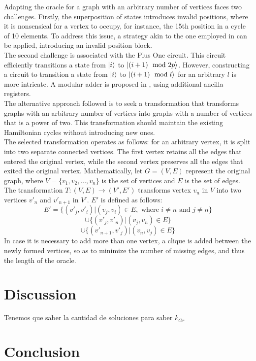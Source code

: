 \documentclass[10pt,a4paper]{article}
\begin{document}
Adapting the oracle for a graph with an arbitrary number of vertices faces two challenges. Firstly, the superposition of states introduces invalid positions, where it is nonsensical for a vertex to occupy, for instance, the 15th position in a cycle of 10 elements. To address this issue, a strategy akin to the one employed in \cite{Coloring1} can be applied, introducing an invalid position block.\\
The second challenge is associated with the Plus One circuit. This circuit efficiently transitions a state from $\ket{i}$ to $\ket{(i + 1) \mod 2p}$. However, constructing a circuit to transition a state from $\ket{i}$ to $\ket{(i + 1) \mod l}$ for an arbitrary $l$ is more intricate. A modular adder is proposed in \cite{modular}, using additional ancilla registers.\\
The alternative approach followed is to seek a transformation that transforms graphs with an arbitrary number of vertices into graphs with a number of vertices that is a power of two. This transformation should maintain the existing Hamiltonian cycles without introducing new ones.\\
The selected transformation operates as follows: for an arbitrary vertex, it is split into two separate connected vertices. The first vertex retains all the edges that entered the original vertex, while the second vertex preserves all the edges that exited the original vertex. Mathematically, let $G = (V, E)$ represent the original graph, where $V = \{v_1, v_2, ..., v_n\}$ is the set of vertices and $E$ is the set of edges. The transformation $T : (V, E) \rightarrow (V', E')$ transforms vertex $v_n$ in $V$ into two vertices $v'_n$ and $v'_{n+1}$ in $V'$. $E'$ is defined as follows:
$$ E' = \{(v'_j, v'_i) | (v_j, v_i) \in E, \text{ where } i \neq n \text{ and } j \neq n\} $$
$$\cup \{(v'_j, v'_n) | (v_j, v_n) \in E\} $$
$$\cup \{(v'_{n+1}, v'_j) | (v_n, v_j) \in E\} $$
In case it is necessary to add more than one vertex, a clique is added between the newly formed vertices, so as to minimize the number of missing edges, and thus the length of the oracle.

\section{Discussion}
Tenemos que saber la cantidad de soluciones para saber $k_{Gr}$

\section{Conclusion}


 

\end{document}
